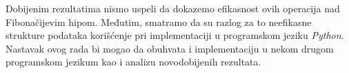 \documentclass[a4paper]{article}
\theoremstyle{plain}
\theoremstyle{definition}
\begin{document}
Dobijenim rezultatima nismo uspeli da dokazemo efikasnost ovih operacija nad Fibona\v{c}ijevim hipom. Međutim, smatramo da su razlog za to neefikasne strukture podataka kori\v{s}\'{c}enje pri implementaciji u programskom jeziku \emph{Python}. Nastavak ovog rada bi mogao da obuhvata i implementaciju u nekom drugom programskom jezikum kao i analizu novodobijenih rezultata.

\appendix



\end{document}
